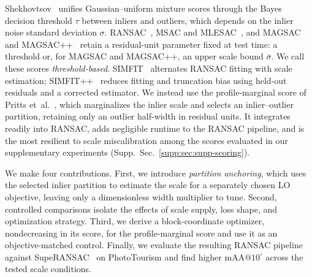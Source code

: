 \documentclass[runningheads]{llncs}
\newcommand{\suppsec}[1]{Supp.\ Sec.~\ref{supp:#1}}
\begin{document}
Shekhovtsov~\cite{Shekhovtsov2025} unifies Gaussian--uniform mixture
scores through the Bayes decision threshold $\tau$ between inliers and
outliers, which depends on the inlier noise standard deviation
$\sigma$. RANSAC~\cite{Fischler1981}, MSAC and MLESAC~\cite{Torr2000},
and MAGSAC and MAGSAC++~\cite{Barath2019,Barath2020} retain a
residual-unit parameter fixed at test time: a threshold or, for MAGSAC
and MAGSAC++, an upper scale bound $\bar\sigma$. We call these scores
\emph{threshold-based}. SIMFIT~\cite{Heinrich2013} alternates RANSAC
fitting with scale estimation; SIMFIT++~\cite{Edstedt2025} reduces
fitting and truncation bias using held-out residuals and a corrected
estimator. We instead use the profile-marginal score of Pritts
et~al.~\cite{PrittsScoring2026}, which marginalizes the inlier scale
and selects an inlier--outlier partition, retaining only an outlier
half-width in residual units.  It integrates readily into RANSAC, adds
negligible runtime to the RANSAC pipeline, and is the most resilient
to scale miscalibration among the scores evaluated in our
supplementary experiments (\suppsec{sec:supp-scoring}).

We make four contributions. First, we introduce \emph{partition
	anchoring}, which uses the selected inlier partition to estimate the
scale for a separately chosen LO objective, leaving only a dimensionless
width multiplier to tune. Second, controlled comparisons isolate the
effects of scale supply, loss shape, and optimization strategy. Third,
we derive a block-coordinate optimizer, nondecreasing in its score, for the profile-marginal
score and use it as an objective-matched control. Finally, we evaluate
the resulting RANSAC pipeline against
SupeRANSAC~\cite{BarathSupeRANSAC2025} on PhotoTourism and find higher
mAA@$10^\circ$ across the tested scale conditions.

\end{document}
